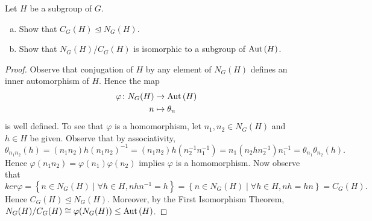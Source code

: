 \documentclass[10pt]{amsart}
\begin{document}
\begin{thm}
  Let $H$ be a subgroup of $G$.
  \begin{enumerate}[(a)]
  \item
    Show that $C_G(H) \unlhd N_G(H)$.
  \item
    Show that $N_G(H)/C_G(H)$ is isomorphic to a subgroup of $\operatorname{Aut}\left(H\right)$.
  \end{enumerate}
  \begin{proof}
    Observe that conjugation of $H$ by any element of $N_G(H)$ defines an inner automorphism of $H$.
    Hence the map
    \begin{align*}
      \varphi \colon N_G(H) &\rightarrow \operatorname{Aut}\left(H\right)\\
      n &\mapsto \theta_n
    \end{align*}
    is well defined.
    To see that $\varphi$ is a homomorphism, let $n_1,n_2 \in N_G(H)$ and $h \in H$ be given.
    Observe that by associativity, $$\theta_{n_1n_2}(h) = (n_1n_2)h(n_1n_2)^{-1} = (n_1n_2) h (n_2^{-1}n_1^{-1}) = n_1(n_2 h n_2^{-1})n_1^{-1} = \theta_{n_1}\theta_{n_2}(h).$$
    Hence $\varphi(n_1n_2) = \varphi(n_1)\varphi(n_2)$ implies $\varphi$ is a homomorphism.
    Now observe that $$ker\varphi = \left\{n \in N_G(H) \mid \forall h \in H, nhn^{-1} = h\right\} = \left\{n \in N_G(H) \mid \forall h \in H, nh = hn\right\} = C_G(H).$$
    Hence $C_G(H) \unlhd N_G(H)$.  
    Moreover, by the First Isomorphism Theorem, $N_G(H)/C_G(H) \cong \varphi(N_G(H)) \leq \operatorname{Aut}\left(H\right)$.
  \end{proof}
\end{thm}
\end{document}
